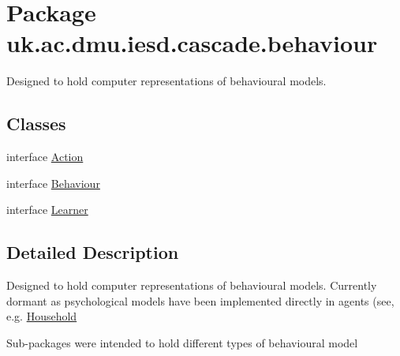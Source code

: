 \hypertarget{namespaceuk_1_1ac_1_1dmu_1_1iesd_1_1cascade_1_1behaviour}{\section{Package uk.\-ac.\-dmu.\-iesd.\-cascade.\-behaviour}
\label{namespaceuk_1_1ac_1_1dmu_1_1iesd_1_1cascade_1_1behaviour}
}


Designed to hold computer representations of behavioural models.  


\subsection*{Classes}
\begin{DoxyCompactItemize}
\item 
interface \hyperlink{interfaceuk_1_1ac_1_1dmu_1_1iesd_1_1cascade_1_1behaviour_1_1_action}{Action}
\item 
interface \hyperlink{interfaceuk_1_1ac_1_1dmu_1_1iesd_1_1cascade_1_1behaviour_1_1_behaviour}{Behaviour}
\item 
interface \hyperlink{interfaceuk_1_1ac_1_1dmu_1_1iesd_1_1cascade_1_1behaviour_1_1_learner}{Learner}
\end{DoxyCompactItemize}


\subsection{Detailed Description}
Designed to hold computer representations of behavioural models. Currently dormant as psychological models have been implemented directly in agents (see, e.\-g. \hyperlink{}{Household}

Sub-\/packages were intended to hold different types of behavioural model 